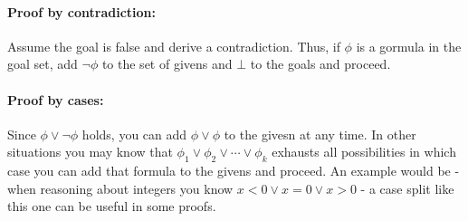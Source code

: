\documentclass[11pt]{article}
\begin{document}
\paragraph{Proof by contradiction:} 

Assume the goal is false and derive a contradiction. Thus, if $\phi$ is a
gormula in the goal set, add $\neg \phi$ to the set of givens and $\bot$ to the
goals and proceed.

\paragraph{Proof by cases:} Since $\phi\vee\neg\phi$ holds, you can add
$\phi\vee\phi$ to the givesn at any time. In other situations you may know that
$\phi_1\vee\phi_2\vee\cdots\vee\phi_k$ exhausts all possibilities in which case
you can add that formula to the givens and proceed.  An example would be - when
reasoning about integers you know $x < 0 \vee x = 0 \vee x > 0$ - a case split
like this one can be useful in some proofs.




\end{document}
